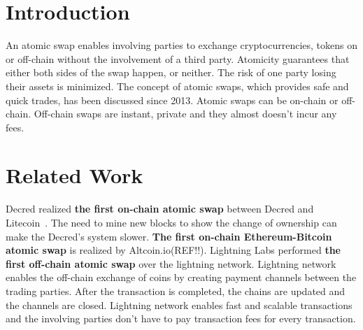 \section{Introduction}\label{sec:intro}
An atomic swap enables involving parties to exchange cryptocurrencies, tokens on or off-chain without the involvement of a third party. Atomicity guarantees that either both sides of the swap happen, or neither. The risk of one party losing their assets is minimized. The concept of atomic swaps, which provides safe and quick trades, has been discussed since 2013\cite{altcoin}. Atomic swaps can be on-chain or off-chain. Off-chain swaps are instant, private and they almost doesn't incur any fees. %


\section{Related Work}
Decred realized \textbf{the first on-chain atomic swap} between Decred and Litecoin~\cite{decred}. The need to mine new blocks to show the change of ownership can make the Decred's system slower. \textbf{The first on-chain Ethereum-Bitcoin atomic swap} is realized by Altcoin.io(REF!!). Lightning Labs performed \textbf{the first off-chain atomic swap} over the lightning network. Lightning network enables the off-chain exchange of coins  by creating payment channels between the trading parties. After the transaction is completed, the chains are updated and the channels are closed. Lightning network enables fast and scalable transactions and the involving parties don't have to pay transaction fees for every transaction.

